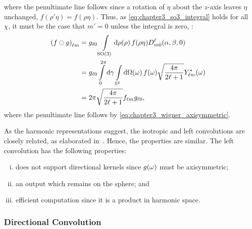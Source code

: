 %
where the penultimate line follows since a rotation of \({\eta}\) about the \(z\)-axis leaves \({\eta}\) unchanged, \ie{} \(f(\rho'\eta) = f(\rho\eta)\).
Thus, as \cref{eq:chapter3_so3_integral} holds for all \(\chi{}\), it must be the case that \(m'=0\) unless the integral is zero, \ie{}:
%
\begin{align}
	{(f \circleddash g)}_{\ell m}
	 & = {g}_{\ell 0} \int\limits_{\text{SO(3)}} \dd{\rho(\rho)} f(\rho\eta) D^{\ell}_{m0} (\alpha,\beta,0) \nonumber{}                                               \\
	 & = {g}_{\ell 0} \int\limits_{0}^{2\pi} \dd{\gamma} \int\limits_{\mathbb{S}^{2}} \dd{\Omega(\omega)} f(\omega) \sqrt{\frac{4\pi}{2\ell+1}} {Y}_{\ell m}^{\ast}(\omega) \nonumber{} \\
	 & = 2\pi \sqrt{\frac{4\pi}{2\ell+1}} {f}_{\ell m} {g}_{\ell 0},
\end{align}
%
where the penultimate line follows by \cref{eq:chapter3_wigner_axisymmetric}.

As the harmonic representations suggest, the isotropic and left convolutions are closely related, as elaborated in~\autocite{Kennedy2011}.
Hence, the properties are similar.
The left convolution has the following properties:
%
\begin{enumerate}[(i),nosep]
	\item does not support directional kernels since \(g(\omega)\) must be axisymmetric;
	\item an output which remains on the sphere; and
	\item efficient computation since it is a product in harmonic space.
\end{enumerate}

\subsubsection{Directional Convolution}

